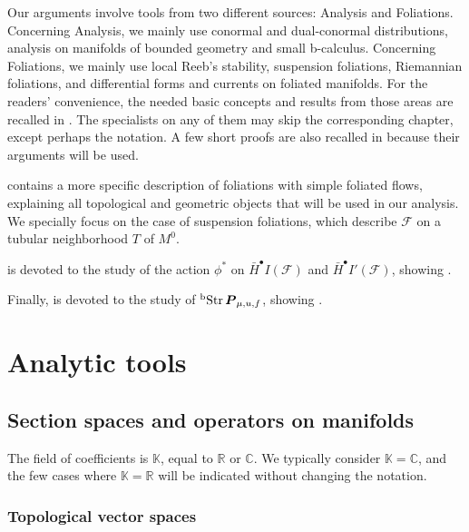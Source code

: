 \documentclass{memo-l}
\theoremstyle{plain}
\theoremstyle{definition}
\theoremstyle{remark}
\newcommand{\C}{\mathbb{C}}
\newcommand{\K}{\mathbb{K}}
\newcommand{\R}{\mathbb{R}}
\newcommand{\FF}{\mathcal{F}}
\newcommand{\bfP}{\boldsymbol{P}}
\newcommand{\Str}{\operatorname{Str}}
\newcommand{\bStr}{{}^{\text{\rm b}}\!\Str}
\numberwithin{section}{chapter}
\numberwithin{equation}{section}%
\begin{document}
Our arguments involve tools from two different sources: Analysis and Foliations. Concerning Analysis, we mainly use conormal and dual-conormal distributions, analysis on manifolds of bounded geometry and small b-calculus. Concerning Foliations, we mainly use local Reeb's stability, suspension foliations, Riemannian foliations, and differential forms and currents on foliated manifolds.  For the readers' convenience, the needed basic concepts and results from those areas are recalled in . The specialists on any of them may skip the corresponding chapter, except perhaps the notation. A few short proofs are also recalled in  because their arguments will be used.

 contains a more specific description of foliations with simple foliated flows, explaining all topological and geometric objects that will be used in our analysis. We specially focus on the case of suspension foliations, which describe $\FF$ on a tubular neighborhood $T$ of $M^0$. 

 is devoted to the study of the action $\phi^*$ on $\bar H^\bullet I(\FF)$ and $\bar H^\bullet I'(\FF)$, showing .

Finally,  is devoted to the study of $\bStr\bfP_{\mu,u,f}$, showing .



\chapter{Analytic tools}\label{ch: analytic tools}

\section{Section spaces and operators on manifolds}\label{s: section sps and opers}

The field of coefficients is $\K$, equal to $\R$ or $\C$. We typically consider $\K=\C$, and the few cases where $\K=\R$ will be indicated without changing the notation.

\subsection{Topological vector spaces}\label{ss: TVS}
\end{document}
